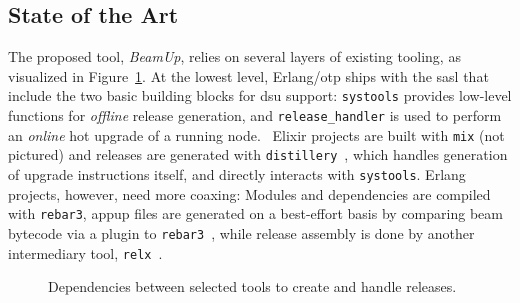 \cleardoublepage
\subsection{State of the Art}\label{sec:sota}

The proposed tool, \emph{BeamUp}, relies on several layers of existing tooling, as visualized in Figure~\ref{fig:tools}. At the lowest level, Erlang/\acrshort{otp} ships with the \acrfull{sasl} that include the two basic building blocks for \acrshort{dsu} support: \lstinline|systools| provides low-level functions for \emph{offline} release generation, and \lstinline|release_handler| is used to perform an \emph{online} hot upgrade of a running node.~\cite{doc:otp}
Elixir projects are built with \lstinline|mix| (not pictured) and releases are generated with \lstinline|distillery|~\cite{distillery}, which handles generation of upgrade instructions itself, and directly interacts with \lstinline|systools|. Erlang projects, however, need more coaxing: Modules and dependencies are compiled with \lstinline|rebar3|, \acrfull{appup} files are generated on a best-effort basis by comparing \acrshort{beam} bytecode via a plugin to \lstinline|rebar3|~\cite{rebar3appup}, while release assembly is done by another intermediary tool, \lstinline|relx|~\cite{loder2016production}.

\vspace{2cm}
\begin{figure}[h]
  \caption{Dependencies between selected tools to create and handle releases.}\label{fig:tools}
\end{figure}

